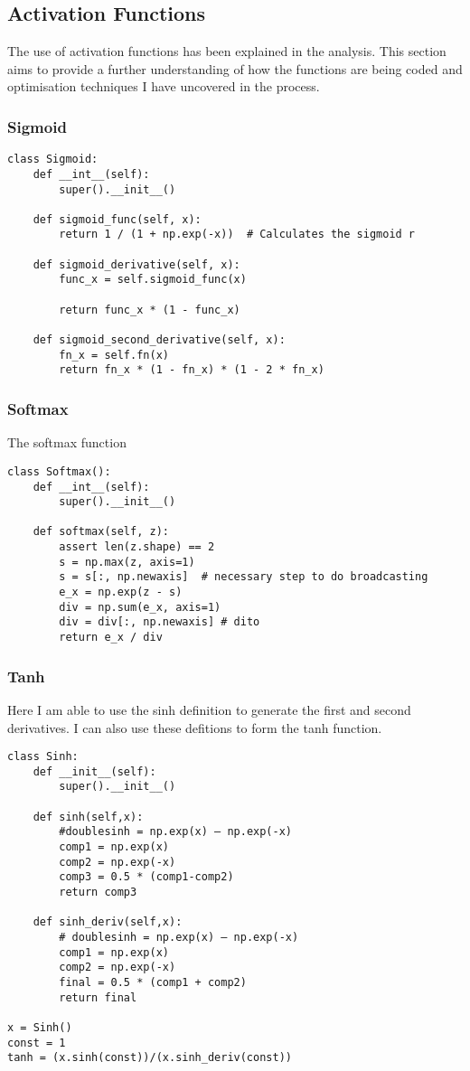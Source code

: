 \documentclass{article}
\begin{document}
\subsection{Activation Functions}
The use of activation functions has been explained in the analysis. This section
aims to provide a further understanding of how the functions are being coded and
optimisation techniques I have uncovered in the process.
\subsubsection{Sigmoid}
\begin{lstlisting}
class Sigmoid:
    def __int__(self):
        super().__init__()

    def sigmoid_func(self, x):
        return 1 / (1 + np.exp(-x))  # Calculates the sigmoid r

    def sigmoid_derivative(self, x):
        func_x = self.sigmoid_func(x)

        return func_x * (1 - func_x)

    def sigmoid_second_derivative(self, x):
        fn_x = self.fn(x)
        return fn_x * (1 - fn_x) * (1 - 2 * fn_x)

\end{lstlisting}
\subsubsection{Softmax}
The softmax function


\begin{lstlisting}
class Softmax():
    def __int__(self):
        super().__init__()

    def softmax(self, z):
        assert len(z.shape) == 2
        s = np.max(z, axis=1)
        s = s[:, np.newaxis]  # necessary step to do broadcasting
        e_x = np.exp(z - s)
        div = np.sum(e_x, axis=1)
        div = div[:, np.newaxis] # dito
        return e_x / div
\end{lstlisting}


\subsubsection{Tanh}
Here I am able to use the sinh definition to generate the first and second
derivatives. I can also use these defitions to form the tanh function.


\begin{lstlisting}
class Sinh:
    def __init__(self):
        super().__init__()

    def sinh(self,x):
        #doublesinh = np.exp(x) – np.exp(-x)
        comp1 = np.exp(x)
        comp2 = np.exp(-x)
        comp3 = 0.5 * (comp1-comp2)
        return comp3

    def sinh_deriv(self,x):
        # doublesinh = np.exp(x) – np.exp(-x)
        comp1 = np.exp(x)
        comp2 = np.exp(-x)
        final = 0.5 * (comp1 + comp2)
        return final

x = Sinh()
const = 1
tanh = (x.sinh(const))/(x.sinh_deriv(const))
\end{lstlisting}
\end{document}
